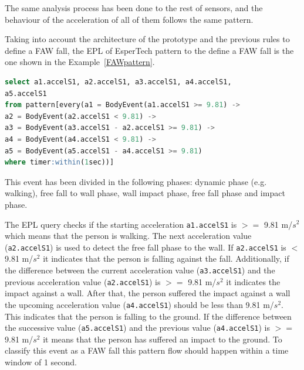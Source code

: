 \documentclass[journal]{IEEEtran}
\begin{document}
The same analysis process has been done to the rest of sensors, and the behaviour of the acceleration of all of 
them follows the same pattern.

Taking into account the architecture of the prototype and the previous rules to define a FAW fall, the EPL of EsperTech
pattern to the define a FAW fall is the one shown in the Example~\ref{FAWpattern}.

\begin{lstlisting}[basicstyle=\ttfamily\scriptsize,language=SQL, mathescape,caption=FAW pattern,label=FAWpattern]
select a1.accelS1, a2.accelS1, a3.accelS1, a4.accelS1, 
a5.accelS1 
from pattern[every(a1 = BodyEvent(a1.accelS1 >= 9.81) -> 
a2 = BodyEvent(a2.accelS1 < 9.81) ->
a3 = BodyEvent(a3.accelS1 - a2.accelS1 >= 9.81) ->
a4 = BodyEvent(a4.accelS1 < 9.81) ->
a5 = BodyEvent(a5.accelS1 - a4.accelS1 >= 9.81) 
where timer:within(1sec))]
\end{lstlisting}



This event has been divided in the following phases: dynamic phase (e.g. walking), free fall to wall phase, wall impact phase, free fall phase and impact phase.

The EPL query checks if the starting acceleration \texttt{\small{a1.accelS1}} is $>=$ 9.81 m/$s^2$ which means that the person is walking. 
The next acceleration value (\texttt{\small{a2.accelS1}}) is used to detect the free fall phase to the wall. If \texttt{\small{a2.accelS1}} 
is $<$ 9.81 m/$s^2$ it indicates that the person is falling against the fall. Additionally, if the difference between 
the current acceleration value (\texttt{\small{a3.accelS1}}) and the previous acceleration value (\texttt{\small{a2.accelS1}}) is $>=$ 9.81 m/$s^2$ 
it indicates the impact against a wall. After that, the person suffered the impact against a wall the upcoming 
acceleration value (\texttt{\small{a4.accelS1}}) should be less than 9.81 m/$s^2$. This indicates that the person is falling to 
the ground. If the difference between the successive value (\texttt{\small{a5.accelS1}}) and the previous value (\texttt{\small{a4.accelS1}}) 
is $>=$ 9.81 m/$s^2$ it means that the person has suffered an impact to the ground. To classify this event as 
a FAW fall this pattern flow should happen within a time window of 1 second.
\end{document}
